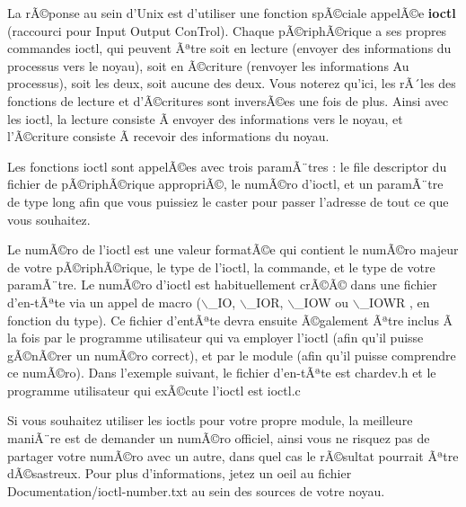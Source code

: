 \documentclass[11pt]{article}
\begin{document}
La rÃ©ponse au sein d'Unix est d'utiliser une fonction spÃ©ciale appelÃ©e \textbf{ioctl} (raccourci pour Input Output ConTrol). Chaque pÃ©riphÃ©rique a ses propres commandes ioctl, qui peuvent Ãªtre soit en lecture (envoyer des informations du processus vers le noyau), soit en Ã©criture (renvoyer les informations Au processus), soit les deux, soit aucune des deux. Vous noterez qu'ici, les rÃ´les des fonctions de lecture et d'Ã©critures sont inversÃ©es une fois de plus. Ainsi avec les ioctl, la lecture consiste Ã  envoyer des informations vers le noyau, et l'Ã©criture consiste Ã  recevoir des informations du noyau.

Les fonctions ioctl sont appelÃ©es avec trois paramÃ¨tres : le file descriptor du fichier de pÃ©riphÃ©rique appropriÃ©, le numÃ©ro d'ioctl, et un paramÃ¨tre de type long afin que vous puissiez le caster pour passer l'adresse de tout ce que vous souhaitez.

Le numÃ©ro de l'ioctl est une valeur formatÃ©e qui contient le numÃ©ro majeur de votre pÃ©riphÃ©rique, le type de l'ioctl, la commande, et le type de votre paramÃ¨tre. Le numÃ©ro d'ioctl est habituellement crÃ©Ã© dans une fichier d'en-tÃªte via un appel de macro ($\backslash$\_IO, $\backslash$\_IOR, $\backslash$\_IOW ou $\backslash$\_IOWR , en fonction du type). Ce fichier d'entÃªte devra ensuite Ã©galement Ãªtre inclus Ã  la fois par le programme utilisateur qui va employer l'ioctl (afin qu'il puisse gÃ©nÃ©rer un numÃ©ro correct), et par le module (afin qu'il puisse comprendre ce numÃ©ro). Dans l'exemple suivant, le fichier d'en-tÃªte est chardev.h et le programme utilisateur qui exÃ©cute l'ioctl est ioctl.c

Si vous souhaitez utiliser les ioctls pour votre propre module, la meilleure maniÃ¨re est de demander un numÃ©ro officiel, ainsi vous ne risquez pas de partager votre numÃ©ro avec un autre, dans quel cas le rÃ©sultat pourrait Ãªtre dÃ©sastreux. Pour plus d'informations, jetez un oeil au fichier Documentation/ioctl-number.txt au sein des sources de votre noyau.
\end{document}
